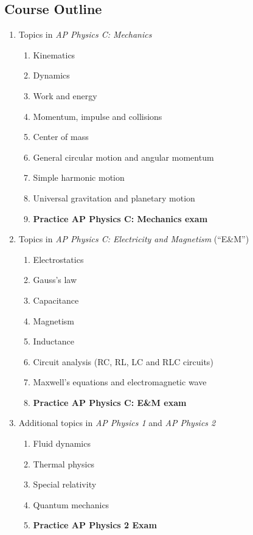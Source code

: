 \documentclass[11pt]{article}
\begin{document}
\subsection*{Course Outline}
\begin{enumerate}[itemsep=0pt,leftmargin=15pt]
\item Topics in \emph{AP Physics C: Mechanics}
  \begin{enumerate}[itemsep=0pt,leftmargin=18pt]
  \item Kinematics
  \item Dynamics
  \item Work and energy
  \item Momentum, impulse and collisions
  \item Center of mass
  \item General circular motion and angular momentum
  \item Simple harmonic motion %
  \item Universal gravitation and planetary motion
  \item\textbf{Practice AP Physics C: Mechanics exam}
  \end{enumerate}
\item Topics in \emph{AP Physics C: Electricity and Magnetism} (``E\&M'')
  \begin{enumerate}[itemsep=0pt,leftmargin=18pt]
  \item Electrostatics
  \item Gauss's law
  \item Capacitance
  \item Magnetism
  \item Inductance
  \item Circuit analysis (RC, RL, LC and RLC circuits)
  \item Maxwell's equations and electromagnetic wave
  \item\textbf{Practice AP Physics C: E\&M exam}
  \end{enumerate}
\item Additional topics in \emph{AP Physics 1} and \emph{AP Physics 2}
  \begin{enumerate}[itemsep=0pt,leftmargin=18pt]
  \item Fluid dynamics
  \item Thermal physics
  \item Special relativity
  \item Quantum mechanics
  \item\textbf{Practice AP Physics 2 Exam}
  \end{enumerate}
\end{enumerate}
\end{document}

